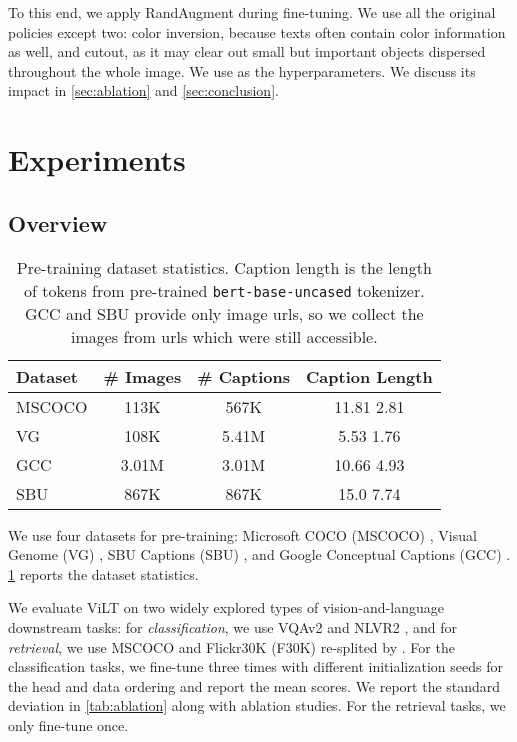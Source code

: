 \documentclass{article}
\makeatletter
\newlength\mylen
\DeclareRobustCommand*\Textsuperscript[1]{\@Textsuperscript{\selectfont#1}}
\def\@Textsuperscript#1{\settoheight\mylen{\fontsize\f@size\z@ A}{\m@th\ensuremath{\raise.3\mylen\hbox{\fontsize\sf@size\z@#1}}}}
\makeatother
\begin{document}
To this end, we apply RandAugment \citep{cubuk2020randaugment} during fine-tuning.
We use all the original policies except two: color inversion, because texts often contain color information as well, and cutout, as it may clear out small but important objects dispersed throughout the whole image.
We use  as the hyperparameters.
We discuss its impact in \cref{sec:ablation} and \cref{sec:conclusion}.

\section{Experiments}
\label{sec:experiments}

\subsection{Overview}

\begin{table}[t]
    \caption{Pre-training dataset statistics. Caption length is the length of tokens from pre-trained \texttt{bert-base-uncased} tokenizer. {\textdagger} GCC and SBU provide only image urls, so we collect the images from urls which were still accessible.}
    \label{tab:pre-train_datasets}
    \begin{center}
        {\fontsize{10.1pt}{10.1pt}\selectfont
    \begin{tabular}{lccc}
        \toprule
   Dataset & \# Images    & \# Captions  & Caption Length    \\ \midrule
   MSCOCO & 113K    & 567K   & 11.81  2.81  \\
   VG   & 108K   & 5.41M & 5.53  1.76   \\
   GCC\Textsuperscript{\textdagger}   & 3.01M & 3.01M & 10.66  4.93  \\
   SBU\Textsuperscript{\textdagger}  & 867K   & 867K   & 15.0  7.74  \\ \bottomrule
   \end{tabular}}
\end{center}
\end{table}

We use four datasets for pre-training: Microsoft COCO (MSCOCO) \citep{lin2014microsoft}, Visual Genome (VG) \citep{krishna2017visual}, SBU Captions (SBU) \citep{ordonez2011im2text}, and Google Conceptual Captions (GCC) \citep{sharma2018conceptual}.
\cref{tab:pre-train_datasets} reports the dataset statistics.

We evaluate ViLT on two widely explored types of vision-and-language downstream tasks: for \textit{classification}, we use VQAv2 \citep{goyal2017making} and NLVR2 \citep{suhr2018corpus}, and for \textit{retrieval}, we use MSCOCO and Flickr30K (F30K) \citep{plummer2015flickr30k} re-splited by \citet{karpathy2015deep}.
For the classification tasks, we fine-tune three times with different initialization seeds for the head and data ordering and report the mean scores.
We report the standard deviation in \cref{tab:ablation} along with ablation studies.
For the retrieval tasks, we only fine-tune once.
\end{document}
